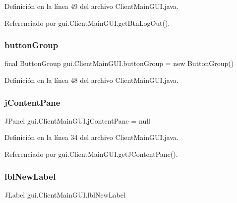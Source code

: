 Definición en la línea 49 del archivo Client\+Main\+G\+U\+I.\+java.



Referenciado por gui.\+Client\+Main\+G\+U\+I.\+get\+Btn\+Log\+Out().

\mbox{\label{classgui_1_1_client_main_g_u_i_a55bab99544dc2947a28f42cc9f32360e}} 
\subsubsection{\texorpdfstring{buttonGroup}{buttonGroup}}
{\footnotesize\ttfamily final Button\+Group gui.\+Client\+Main\+G\+U\+I.\+button\+Group = new Button\+Group()\hspace{0.3cm}{\ttfamily [private]}}



Definición en la línea 48 del archivo Client\+Main\+G\+U\+I.\+java.

\mbox{\label{classgui_1_1_client_main_g_u_i_a27d9ef1b843aeaa940da60efee19d26c}} 
\subsubsection{\texorpdfstring{jContentPane}{jContentPane}}
{\footnotesize\ttfamily J\+Panel gui.\+Client\+Main\+G\+U\+I.\+j\+Content\+Pane = null\hspace{0.3cm}{\ttfamily [private]}}



Definición en la línea 34 del archivo Client\+Main\+G\+U\+I.\+java.



Referenciado por gui.\+Client\+Main\+G\+U\+I.\+get\+J\+Content\+Pane().

\mbox{\label{classgui_1_1_client_main_g_u_i_a3aa18457987ffd805e145460480b360e}} 
\subsubsection{\texorpdfstring{lblNewLabel}{lblNewLabel}}
{\footnotesize\ttfamily J\+Label gui.\+Client\+Main\+G\+U\+I.\+lbl\+New\+Label\hspace{0.3cm}{\ttfamily [protected]}}



